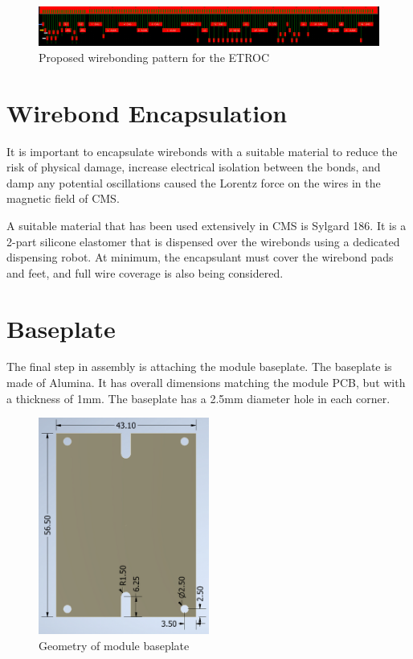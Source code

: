 \documentclass[10pt]{datasheet}
\begin{document}
\begin{figure}[h]
	\centering
	\includegraphics[width=\textwidth]{figures/wirebonding-pattern.png}
	\caption{Proposed wirebonding pattern for the ETROC}
	\label{fig:wirebonding-pattern}	
\end{figure}

\section{Wirebond Encapsulation}

It is important to encapsulate wirebonds with a suitable material to reduce the risk of physical damage, increase electrical isolation between the bonds, and damp any potential oscillations caused the Lorentz force on the wires in the magnetic field of CMS.

A suitable material that has been used extensively in CMS is Sylgard 186. It is a 2-part silicone elastomer that is dispensed over the wirebonds using a dedicated dispensing robot. At minimum, the encapsulant must cover the wirebond pads and feet, and full wire coverage is also being considered.

\section{Baseplate}

The final step in assembly is attaching the module baseplate. The baseplate is made of Alumina. It has overall dimensions matching the module PCB, but with a thickness of 1mm. The baseplate has a 2.5mm diameter hole in each corner. 

\begin{figure}[h]
	\centering
	\includegraphics[width=0.5\textwidth,angle=-90]{figures/baseplate.png}
	\caption{Geometry of module baseplate}
	\label{fig:baseplate}	
\end{figure}
\end{document}
